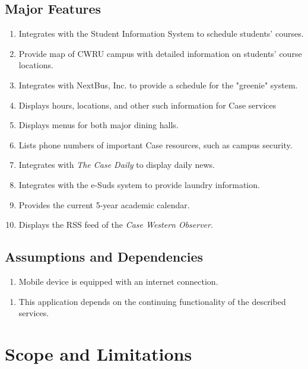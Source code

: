\documentclass[pdftex,12pt,letter]{article}
\begin{document}
\subsection{Major Features}
\begin{enumerate}[FE-1:]
\item Integrates with the Student Information System to schedule students' courses.
\item Provide map of CWRU campus with detailed information on students' course locations.
\item Integrates with NextBus, Inc. to provide a schedule for the "greenie" system.
\item Displays hours, locations, and other  such information for Case services
\item Displays menus for both major dining halls.
\item Lists phone numbers of important Case resources, such as campus security.
\item Integrates with \emph{The Case Daily} to display daily news.
\item Integrates with the e-Suds system to provide laundry information.
\item Provides the current 5-year academic calendar.
\item Displays the RSS feed of the \emph{Case Western Observer}.
\end{enumerate} 
\subsection{Assumptions and Dependencies}
\begin{enumerate}[{A}S-1:]
\item Mobile device is equipped with an internet connection.
\end{enumerate}
\begin{enumerate}[DE-1:]
\item This application depends on the continuing functionality of the described services.
\end{enumerate}
\section{Scope and Limitations}
\end{document}
